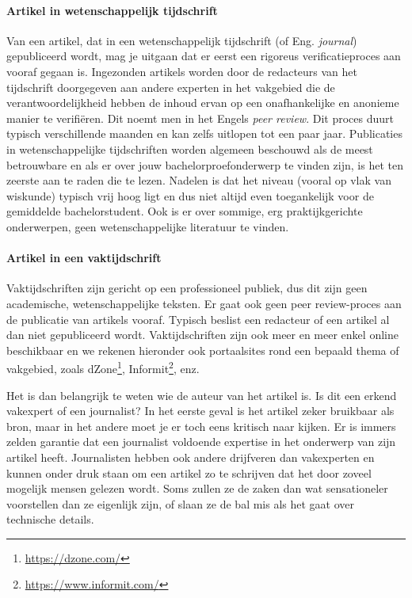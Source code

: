 \paragraph{Artikel in wetenschappelijk tijdschrift}

Van een artikel, dat in een wetenschappelijk tijdschrift (of Eng. \emph{journal}) gepubliceerd wordt, mag je uitgaan dat er eerst een rigoreus verificatieproces aan vooraf gegaan is. Ingezonden artikels worden door de redacteurs van het tijdschrift doorgegeven aan andere experten in het vakgebied die de verantwoordelijkheid hebben de inhoud ervan op een onafhankelijke en anonieme manier te verifiëren. Dit noemt men in het Engels \emph{peer review}. Dit proces duurt typisch verschillende maanden en kan zelfs uitlopen tot een paar jaar. Publicaties in wetenschappelijke tijdschriften worden algemeen beschouwd als de meest betrouwbare en als er over jouw bachelorproefonderwerp te vinden zijn, is het ten zeerste aan te raden die te lezen. Nadelen is dat het niveau (vooral op vlak van wiskunde) typisch vrij hoog ligt en dus niet altijd even toegankelijk voor de gemiddelde bachelorstudent. Ook is er over sommige, erg praktijkgerichte onderwerpen, geen wetenschappelijke literatuur te vinden.

\paragraph{Artikel in een vaktijdschrift}

Vaktijdschriften zijn gericht op een professioneel publiek, dus dit zijn geen academische, wetenschappelijke teksten. Er gaat ook geen peer review-proces aan de publicatie van artikels vooraf. Typisch beslist een redacteur of een artikel al dan niet gepubliceerd wordt. Vaktijdschriften zijn ook meer en meer enkel online beschikbaar en we rekenen hieronder ook portaalsites rond een bepaald thema of vakgebied, zoals dZone\footnote{\url{https://dzone.com/}}, Informit\footnote{\url{https://www.informit.com/}}, enz.

Het is dan belangrijk te weten wie de auteur van het artikel is. Is dit een erkend vakexpert of een journalist? In het eerste geval is het artikel zeker bruikbaar als bron, maar in het andere moet je er toch eens kritisch naar kijken. Er is immers zelden garantie dat een journalist voldoende expertise in het onderwerp van zijn artikel heeft. Journalisten hebben ook andere drijfveren dan vakexperten en kunnen onder druk staan om een artikel zo te schrijven dat het door zoveel mogelijk mensen gelezen wordt. Soms zullen ze de zaken dan wat sensationeler voorstellen dan ze eigenlijk zijn, of slaan ze de bal mis als het gaat over technische details.

